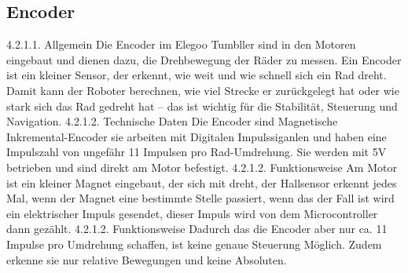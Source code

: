 \subsection{Encoder}
%
4.2.1.1. Allgemein
Die Encoder im Elegoo Tumbller sind in den Motoren eingebaut und dienen dazu, die Drehbewegung der Räder zu messen.
Ein Encoder ist ein kleiner Sensor, der erkennt, wie weit und wie schnell sich ein Rad dreht. Damit kann der Roboter berechnen, wie viel Strecke er zurückgelegt hat oder wie stark sich das Rad gedreht hat – das ist wichtig für die Stabilität, Steuerung und Navigation.
4.2.1.2. Technische Daten
Die Encoder sind Magnetische Inkremental-Encoder sie arbeiten mit Digitalen Impulssiganlen und haben eine Impulszahl von ungefähr 11 Impulsen pro Rad-Umdrehung. Sie werden mit 5V betrieben und sind direkt am Motor befestigt. 
4.2.1.2. Funktionsweise
Am Motor ist ein kleiner Magnet eingebaut, der sich mit dreht, der Hallsensor erkennt jedes Mal, wenn der Magnet eine bestimmte Stelle passiert, wenn das der Fall ist wird ein elektrischer Impuls gesendet, dieser Impuls wird von dem Microcontroller dann gezählt.
4.2.1.2. Funktionsweise
Dadurch das die Encoder aber nur ca. 11 Impulse pro Umdrehung schaffen, ist keine genaue Steuerung Möglich. Zudem erkenne sie nur relative Bewegungen und keine Absoluten.
%
